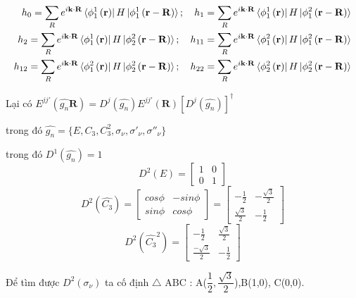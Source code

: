 \documentclass{report}
\begin{document}
\begin{align}
    h_0 = \sum_{R} e^{i\mathbf{k\cdot R}} \bra*{\phi_1^1 \left(\mathbf{r}\right)} H \ket*{\phi_1^1\left(\mathbf{r}-\mathbf{R}\right)}; \quad h_1 = \sum_{R} e^{i\mathbf{k\cdot R}} \bra*{\phi_1^1 \left(\mathbf{r}\right)} H \ket*{\phi_1^2\left(\mathbf{r}-\mathbf{R}\right)} \nonumber     \\
    h_2 = \sum_{R} e^{i\mathbf{k\cdot R}} \bra*{\phi_1^1 \left(\mathbf{r}\right)} H \ket*{\phi_2^2\left(\mathbf{r}-\mathbf{R}\right)}; \quad  h_{11} = \sum_{R} e^{i\mathbf{k\cdot R}} \bra*{\phi_1^2 \left(\mathbf{r}\right)} H \ket*{\phi_1^2\left(\mathbf{r}-\mathbf{R}\right)} \nonumber \\
    h_{12} = \sum_{R} e^{i\mathbf{k\cdot R}} \bra*{\phi_1^2 \left(\mathbf{r}\right)} H \ket*{\phi_2^2\left(\mathbf{r}-\mathbf{R}\right)}; \quad h_{22} = \sum_{R} e^{i\mathbf{k\cdot R}} \bra*{\phi_2^2 \left(\mathbf{r}\right)} H \ket*{\phi_2^2\left(\mathbf{r}-\mathbf{R}\right)} \nonumber
\end{align}



Lại có $E^{jj'} \left(\hat{g_n}\textbf{R}\right)= D^j(\hat{g_n}) E^{jj'} \left(\textbf{R}\right)\left[D^j(\hat{g_n})\right]^\dagger$


trong đó $\hat{g_n} = \{E,C_3,C^2_3,\sigma_\nu,\sigma'_\nu,\sigma''_\nu\}$


trong đó $D^1(\hat{g_n}) = 1$
\[
    \renewcommand{\arraystretch}{0.75}
    D^2(E) = \begin{bmatrix}
        1 & 0 \\
        0 & 1
    \end{bmatrix}
\]
\[
    \renewcommand{\arraystretch}{0.75}
    D^2(\hat{C_3}) = \begin{bmatrix}
        cos\phi & -sin\phi \\
        sin\phi & cos\phi
    \end{bmatrix}
    = \begin{bmatrix}
        -\frac{1}{2}       & -\frac{\sqrt{3}}{2} \\
        \frac{\sqrt{3}}{2} & -\frac{1}{2}
    \end{bmatrix}
\]
\[
    \renewcommand{\arraystretch}{0.75}
    D^2(\hat{C_3}^2) =
    \begin{bmatrix}
        -\frac{1}{2}        & \frac{\sqrt{3}}{2} \\
        \frac{-\sqrt{3}}{2} & -\frac{1}{2}
    \end{bmatrix}
\]

Để tìm được $D^2(\sigma_\nu)$ ta cố định $\bigtriangleup$ ABC : A($\dfrac{1}{2},\dfrac{\sqrt{3}}{2}$),B(1,0), C(0,0).
\end{document}
